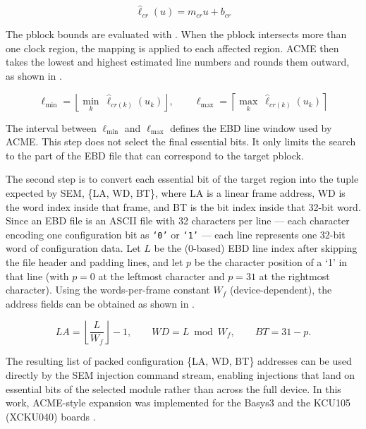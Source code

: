 \begin{equation}
\widehat{\ell}_{cr}(u) = m_{cr}u + b_{cr}
\label{eq:acme-line-map}
\end{equation}

The pblock bounds are evaluated with . When the pblock intersects more than one clock region, the mapping is applied to each affected region. \ac{ACME} then takes the lowest and highest estimated line numbers and rounds them outward, as shown in .

\begin{equation}
\ell_{\min} =
\left\lfloor
\min_{k}\ \widehat{\ell}_{cr(k)}(u_k)
\right\rfloor,
\qquad
\ell_{\max} =
\left\lceil
\max_{k}\ \widehat{\ell}_{cr(k)}(u_k)
\right\rceil
\label{eq:acme-line-window}
\end{equation}

The interval between $\ell_{\min}$ and $\ell_{\max}$ defines the \ac{EBD} line window used by \ac{ACME}. This step does not select the final essential bits. It only limits the search to the part of the \ac{EBD} file that can correspond to the target pblock.

The second step is to convert each essential bit of the target region into the tuple expected by \ac{SEM}, \{LA, WD, BT\}, where LA is a linear frame address, WD is the word index inside that frame, and BT is the bit index inside that 32-bit word. Since an \ac{EBD} file is an ASCII file with 32 characters per line — each character encoding one configuration bit as \texttt{`0'} or \texttt{`1'} — each line represents one 32-bit word of configuration data. Let $L$ be the (0-based) \ac{EBD} line index after skipping the file header and padding lines, and let $p$ be the character position of a `1' in that line (with $p=0$ at the leftmost character and $p=31$ at the rightmost character). Using the words-per-frame constant $W_f$ (device-dependent), the address fields can be obtained as shown in .

\begin{equation}
LA = \left\lfloor \frac{L}{W_f} \right\rfloor - 1,
\qquad
WD = L \bmod W_f,
\qquad
BT = 31 - p.
\label{eq:acme_ebd_to_lawdbt}
\end{equation}

The resulting list of packed configuration \{LA, WD, BT\} addresses can be used directly by the \ac{SEM} injection command stream, enabling injections that land on essential bits of the selected module rather than across the full device. 
In this work, \ac{ACME}-style expansion was implemented for the Basys3 and the KCU105 (XCKU040) boards \cite{basys3,xcku040}.



